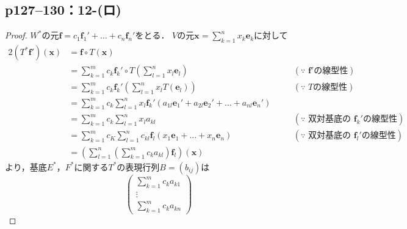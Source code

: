 \documentclass[a4paper,10pt,fleqn]{ltjsarticle}
\begin{document}
\subsection*{p127--130：12-(ロ)}

\begin{tleftbar}
    \begin{proof}
        $ W^\ast$の元$\bm{f}= c_1 \bm{f}_1' + \dots + c_n \bm{f}_n'$をとる．
        $V$の元$\bm{x} =\sum_{k=1}^{n} x_k \bm{e}_k$に対して
        \begin{alignat*}{2}
            (T^\ast \bm{f}') (\bm{x}) & = \bm{f} \circ T(\bm{x})                                                                                                & \quad &                                              \\
                                      & = \sum_{k=1}^{m} c_k \bm{f}_k ' \circ T \left( \sum_{l=1}^{n} x_l \bm{e}_l \right)                                      & \quad & (\text{$\because$~$\bm{f}'$の線型性})            \\
                                      & = \sum_{k=1}^{m} c_k \bm{f}_k ' \left( \sum_{l=1}^{n} x_l T (\bm{e}_l) \right)                                          & \quad & (\text{$\because$~$T$の線型性})                  \\
                                      & = \sum_{k=1}^{m} c_k \sum_{l=1}^{n} x_l \bm{f}_k ' (a_{1l} \bm{e}_1 ' + a_{2l} \bm{e}_2 ' + \dots + a_{nl} \bm{e}_n ' ) & \quad &                                              \\
                                      & = \sum_{k=1}^{m} c_k \sum_{l=1}^{n} x_l a_{kl}                                                                          & \quad & (\text{$\because$~双対基底の定義と$\bm{f}_k '$の線型性}) \\
                                      & = \sum_{k=1}^{m} c_K \sum_{l=1}^{n} c_{kl} \bm{f}_l ( x_1 \bm{e}_1 + \dots + x_n \bm{e}_n)                              &       & (\text{$\because$~双対基底の定義と$\bm{f}_l '$の線型性}) \\
                                      & = \left( \sum_{l=1}^{n} \left( \sum_{k=1}^{m} c_k a_{kl} \right) \bm{f}_l\right) (\bm{x})
        \end{alignat*}
        より，基底$E^\ast$，$F^\ast$に関する$T^\ast$の表現行列$B= (b_{ij})$は
        \[
            \begin{pmatrix} \sum_{k=1}^{m} c_k a_{k1} \\ \vdots \\ \sum_{k=1}^{m} c_k a_{kn} \end{pmatrix}
\]
\end{proof}
\end{tleftbar}
\end{document}
